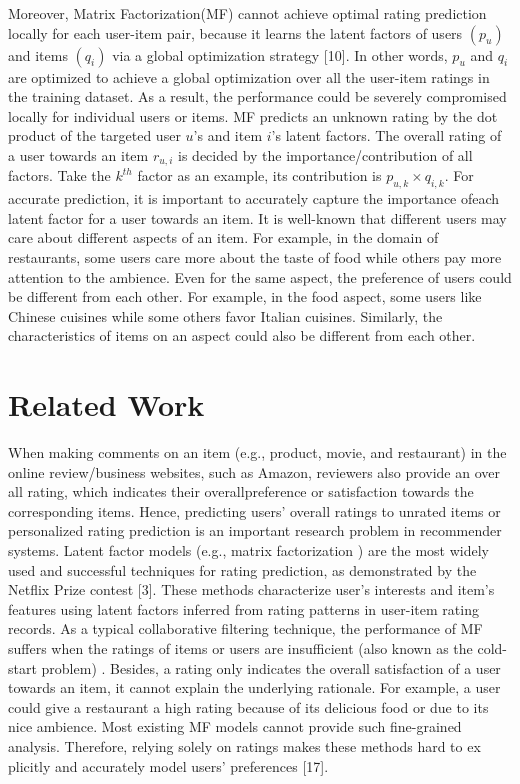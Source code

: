 \documentclass[10pt,conference]{IEEEtran}
\begin{document}
Moreover, Matrix Factorization(MF) cannot achieve optimal rating prediction locally for each user-item pair, because it learns the latent factors of users $(p_u)$ and items $(q_i)$ via a global optimization strategy [10]. In other words, $p_u$ and $q_i$ are optimized to achieve a global optimization over all the user-item ratings in the training dataset. As a result, the performance could be severely compromised locally for individual users or items. MF predicts an unknown rating by the dot product of the targeted user $u$'s and item $i$'s latent factors. The overall rating of a user towards an item $r_{u,i}$ is decided by the importance/contribution of all factors. Take the $k^{th}$ factor as an example, its contribution is $p_{u,k} \times q_{i,k}$. For accurate prediction, it is important to accurately capture the importance ofeach latent factor for a user towards an item. It is well-known that different users may care about different aspects of an item. For example, in the domain of restaurants, some users care more about the taste of food while others pay more attention to the ambience. Even for the same aspect, the preference of users could be different from each other. For example, in the food aspect, some users like Chinese cuisines while some others favor Italian cuisines. Similarly, the characteristics of items on an aspect could also be different from each other.

\section{Related Work}
When making comments on an ite​​m (e.g., product, movie, and restaurant) in the online revi​ew/business websites, such​ as Amazon, reviewers also provide an over​all rating, which indicates their overall ​preference or satisfac​tion towards the corresponding items. Hence, predicting users​' overall ratings to unrated items or personalized rating prediction is an import​ant research problem in recommender systems. Latent factor models (e.g., matrix fa​ctorization \cite{sarwar2001item}) are the most widely used and successful techniques for rati​ng prediction, as demonstrated by the Netflix Prize contest [3]. These methods cha​racterize user's interests and item's features using latent factors inferred from r​ating patterns in user-item rating records. As a typical collaborative filtering techni​que, the performance of MF suffers when the ratings of items or users are insufficien​t (also known as the cold-start problem) \cite{Cremonesi2010}. Besides, a rating only indicates the ov​erall satisfaction of a user towards an item, it cannot explain the underlying rationa​le. For example, a user could give a restaurant a high rating because of its deliciou​s food or due to its nice ambience. Most existing MF models cannot provide such fin​e-grained analysis. Therefore, relying solely on ratings makes these methods hard to ex​plicitly and accurately model users' preferences [17].
\end{document}
